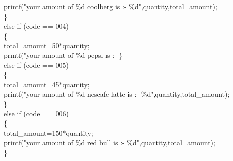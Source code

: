 \documentclass[10pt,a4paper]{article}
\begin{document}
\begin{flushleft}
    \hspace*{0.5cm}  \hspace*{0.5cm}    printf("your amount of \%d coolberg is :- \%d",quantity,total\_amount);\\
    \hspace*{0.5cm}  \}\\
    \hspace*{0.5cm}  else if (code == 004)\\
    \hspace*{0.5cm}  \{\\
    \hspace*{0.5cm}  \hspace*{0.5cm}    total\_amount=50$\ast$quantity;\\
    \hspace*{0.5cm}  \hspace*{0.5cm}    printf("your amount of \%d pepsi is :- %
    \hspace*{0.5cm}  \}\\
    \hspace*{0.5cm}  else if (code == 005)\\
    \hspace*{0.5cm}  \{\\
    \hspace*{0.5cm}  \hspace*{0.5cm}    total\_amount=45$\ast$quantity;\\
    \hspace*{0.5cm}  \hspace*{0.5cm}    printf("your amount of \%d nescafe latte is :- \%d",quantity,total\_amount);\\
    \hspace*{0.5cm}  \}\\
    \hspace*{0.5cm}  else if (code == 006)\\
    \hspace*{0.5cm}  \{\\
    \hspace*{0.5cm}  \hspace*{0.5cm}    total\_amount=150$\ast$quantity;\\
    \hspace*{0.5cm}  \hspace*{0.5cm}   printf("your amount of \%d red bull is :- \%d",quantity,total\_amount);\\
    \hspace*{0.5cm}  \}\\

\end{flushleft}
\end{document}
